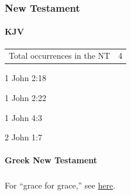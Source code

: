 	\subsubsection{New Testament} %
		\label{ANTICHRIST-NT}
	
		\paragraph{KJV}
			\label{ANTICHRIST-NT-KJV}
			
	
			\begin{tabular}{ll}
				Total occurrences in the NT & 4
			\end{tabular}
			
			\begin{compactdesc}
				\item[1 John 2:18]
				\item[1 John 2:22]
				\item[1 John 4:3]
				\item[2 John 1:7]
			\end{compactdesc}
			
		\paragraph{Greek New Testament} %
			\label{ANTICHRIST-GREEK}
		
			\subparagraph{\texorpdfstring{}{}}
				\label{ANTI}
				
				For ``grace for grace,'' see \hyperref[GRACE-PHRASES]{here}.
			
